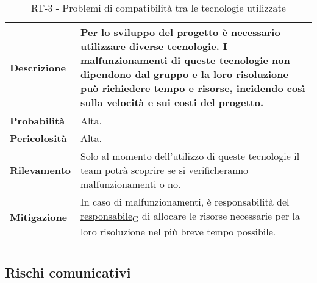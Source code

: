 \begin{longtable}{ | l | p{12cm} | }
	\hline
	\textbf{Descrizione}  & Per lo sviluppo del progetto è necessario utilizzare diverse tecnologie. I malfunzionamenti di queste tecnologie non dipendono dal gruppo e la loro risoluzione può richiedere tempo e risorse, incidendo così sulla velocità e sui costi del progetto. \\
	\hline
	\textbf{Probabilità}  & Alta.                                                                                                                                                                                                                                                   \\
	\hline
	\textbf{Pericolosità} & Alta.                                                                                                                                                                                                                                                   \\
	\hline
	\textbf{Rilevamento}  & Solo al momento dell'utilizzo di queste tecnologie il team potrà scoprire se si verificheranno malfunzionamenti o no.                                                                                                                                   \\
	\hline
	\textbf{Mitigazione}  & In caso di malfunzionamenti, è responsabilità del \href{https://7last.github.io/docs/rtb/documentazione-interna/glossario\#responsabile}{responsabile\textsubscript{G}} di allocare le risorse necessarie per la loro risoluzione nel più breve tempo possibile.                                                                                                 \\
	\hline
	\caption{RT-3 - Problemi di compatibilità tra le tecnologie utilizzate}
\end{longtable}


\newpage


\subsection{Rischi comunicativi}


